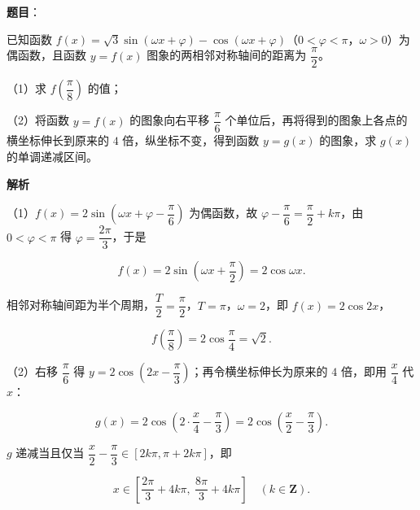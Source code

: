 \begin{answer}

\textbf{题目}：

已知函数 $f(x)=\sqrt3\sin(\omega x+\varphi)-\cos(\omega x+\varphi)$（$0<\varphi<\pi$，$\omega>0$）为偶函数，且函数 $y=f(x)$ 图象的两相邻对称轴间的距离为 $\dfrac{\pi}{2}$。

（1）求 $f\left(\dfrac{\pi}{8}\right)$ 的值；

（2）将函数 $y=f(x)$ 的图象向右平移 $\dfrac{\pi}{6}$ 个单位后，再将得到的图象上各点的横坐标伸长到原来的 $4$ 倍，纵坐标不变，得到函数 $y=g(x)$ 的图象，求 $g(x)$ 的单调递减区间。

\textbf{解析}

（1）$f(x)=2\sin\left(\omega x+\varphi-\dfrac{\pi}6\right)$ 为偶函数，故 $\varphi-\dfrac{\pi}6=\dfrac{\pi}2+k\pi$，由 $0<\varphi<\pi$ 得 $\varphi=\dfrac{2\pi}3$，于是

\nopagebreak[4]
\[f(x)=2\sin\left(\omega x+\frac{\pi}2\right)=2\cos\omega x.\]

相邻对称轴间距为半个周期，$\dfrac{T}2=\dfrac{\pi}2$，$T=\pi$，$\omega=2$，即 $f(x)=2\cos2x$，

\nopagebreak[4]
\[f\left(\frac{\pi}8\right)=2\cos\frac{\pi}4=\sqrt2.\]

（2）右移 $\dfrac{\pi}6$ 得 $y=2\cos\left(2x-\dfrac{\pi}3\right)$；再令横坐标伸长为原来的 $4$ 倍，即用 $\dfrac x4$ 代 $x$：

\nopagebreak[4]
\[g(x)=2\cos\left(2\cdot\frac x4-\frac{\pi}3\right)=2\cos\left(\frac x2-\frac{\pi}3\right).\]

$g$ 递减当且仅当 $\dfrac x2-\dfrac{\pi}3\in\left[2k\pi,\pi+2k\pi\right]$，即

\nopagebreak[4]
\[x\in\left[\frac{2\pi}3+4k\pi,\ \frac{8\pi}3+4k\pi\right]\quad(k\in\mathbf Z).\]


\end{answer}
